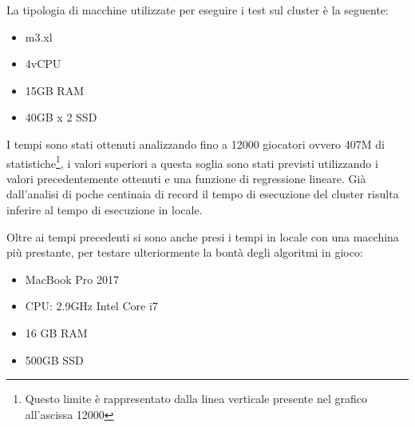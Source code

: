 \documentclass[10pt,a4paper,twocolumn]{article}
\begin{document}
La tipologia di macchine utilizzate per eseguire i test sul cluster è la seguente:
\begin{itemize}
	\item m3.xl
	\item 4vCPU
	\item 15GB RAM
	\item 40GB x 2 SSD
\end{itemize}


I tempi sono stati ottenuti analizzando fino a 12000 giocatori ovvero 407M di statistiche\footnote{Questo limite è rappresentato dalla linea verticale presente nel grafico all'ascissa 12000}, i valori superiori a questa soglia sono stati previsti utilizzando i valori precedentemente ottenuti e una funzione di regressione lineare. Già dall'analisi di poche centinaia di record il tempo di esecuzione del cluster risulta inferire al tempo di esecuzione in locale.

Oltre ai tempi precedenti si sono anche presi i tempi in locale con una macchina più prestante, per testare ulteriormente la bontà degli algoritmi in gioco: 
\begin{itemize}
	\item MacBook Pro 2017
	\item CPU: 2.9GHz Intel Core i7
	\item 16 GB RAM
	\item 500GB SSD
\end{itemize}
\end{document}

